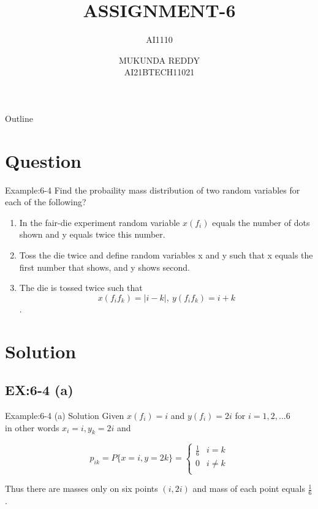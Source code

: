 \documentclass{beamer}
\title[AI1110  Assignment-6]{ASSIGNMENT-6}
\subtitle{AI1110}
\author[]{MUKUNDA REDDY \\ AI21BTECH11021}
\date{}
\begin{document}
  \begin{frame}
      \titlepage
  \end{frame}
  
  \begin{frame}{Outline}
      \tableofcontents
  \end{frame}
  
  \section{Question}
  \begin{frame}{Example:6-4}
  Find the probaility mass distribution of two random variables for each of the following? \\
  \begin{enumerate}[a]
      \item In the fair-die experiment random variable
            $x(f_i)$ equals the number of dots shown and y
            equals twice this number. \\
      \item Toss the die twice  and  define random variables 
            x and y such that x equals the first number that 
            shows, and y shows second. \\
      \item  The die is tossed twice such that 
              $$ x(f_i f_k)=|i-k| ,\: y(f_i f_k)=i+k$$.\\
  \end{enumerate}
  \end{frame}
  
  \section{Solution}
  \subsection{EX:6-4 (a)}
  \begin{frame}{Example:6-4 (a) Solution}
   Given $x(f_i)=i$ and $y(f_i) = 2i$ for $i=1,2,...6$ \\
   in other words $x_i = i , y_k = 2i$ and
   \begin{center}
   \[
      p_{ik} = P\{ x=i,y=2k \} =
   \begin{cases}
   \frac{1}{6} & i=k \\
     0   & i \neq k \\
   \end{cases}
   \]
    \end{center} 
    Thus there are masses only on six points $(i,2i)$ and mass of each point equals $\frac{1}{6}$.\\
  \end{frame}
  
\end{document}
